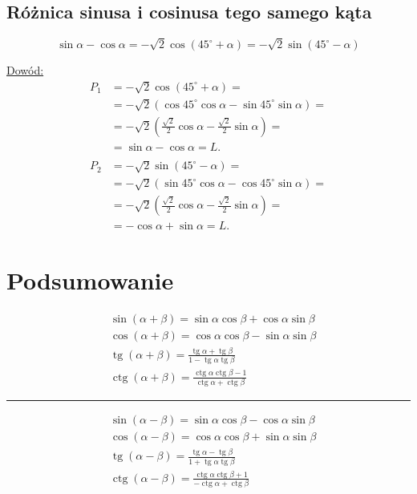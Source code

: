\documentclass[12pt,a4paper,fleqn]{article}
\DeclareMathOperator{\tg}{tg}
\DeclareMathOperator{\ctg}{ctg}
\begin{document}
	\subsection{Różnica sinusa i cosinusa tego samego kąta}
		\begin{equation*}
			\sin\alpha - \cos\alpha = -\sqrt{2}\cos(45^\circ+\alpha) = -\sqrt{2} \sin(45^\circ-\alpha)
		\end{equation*}		
		
		\underline{Dowód:} \noindent
		\begin{align*}
			P_1 &= -\sqrt{2}\cos(45^\circ +\alpha) =\\
				&=-\sqrt{2}(\cos45^\circ\cos\alpha-\sin45^\circ\sin\alpha)=\\
				&= -\sqrt{2}(\frac{\sqrt{2}}{2}\cos\alpha-\frac{\sqrt{2}}{2}\sin\alpha) =\\
				&=\sin\alpha - \cos\alpha=L.
				\\
				\\
			P_2 &= -\sqrt{2} \sin(45^\circ-\alpha) =\\
				&= -\sqrt{2}(\sin45^\circ\cos\alpha - \cos45^\circ\sin\alpha) =\\
				&= -\sqrt{2}(\frac{\sqrt{2}}{2}\cos\alpha - \frac{\sqrt{2}}{2}\sin\alpha) =\\
				&=-\cos\alpha+\sin\alpha=L.				
		\end{align*}
\newpage
\section{Podsumowanie}
	\begin{align*}
		&\sin (\alpha +\beta) = \sin\alpha\cos\beta + \cos\alpha\sin\beta\\
		&\cos (\alpha + \beta) = \cos\alpha\cos\beta - \sin\alpha\sin\beta\\
		&\tg (\alpha + \beta) = \frac{\tg \alpha + \tg \beta}{1 - \tg \alpha \tg \beta}\\
		&\ctg (\alpha + \beta) = \frac{\ctg\alpha\ctg\beta-1}{\ctg\alpha+\ctg\beta}
	\end{align*}
	
	
	\noindent\rule{10cm}{0.4pt}
	\begin{align*}
		&\sin(\alpha-\beta) = \sin\alpha\cos\beta-\cos\alpha\sin\beta\\
		&\cos(\alpha-\beta) = \cos\alpha\cos\beta + \sin\alpha\sin\beta\\
		&\tg(\alpha-\beta)= \frac{\tg \alpha - \tg \beta}{1 + \tg \alpha \tg \beta}\\
		&\ctg (\alpha - \beta) = \frac{\ctg\alpha\ctg\beta+1}{-\ctg\alpha+\ctg\beta}
	\end{align*}
	
\end{document}
